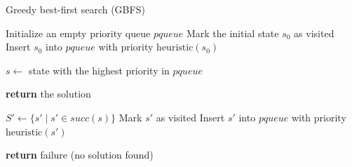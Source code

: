 \documentclass[ppgc,diss,english]{iiufrgs}
\begin{document}
\begin{algorithm}[tb]
\caption{Greedy best-first search (GBFS)}
\label{alg:gbfs}
\begin{algorithmic}[1]
  \State Initialize an empty priority queue $pqueue$
  \State Mark the initial state $s_0$ as visited
  \State Insert $s_0$ into $pqueue$ with priority $\text{heuristic}(s_0)$

    \State $s \gets$ state with the highest priority in $pqueue$

      \State \textbf{return} the solution
    \EndIf

    \State $S' \gets \{s' \mid s' \in succ(s)\}$
        \State Mark $s'$ as visited
        \State Insert $s'$ into $pqueue$ with priority $\text{heuristic}(s')$
      \EndIf
    \EndFor
  \EndWhile

  \State \textbf{return} failure (no solution found)
\EndProcedure
\end{algorithmic}
\end{algorithm}
\end{document}
